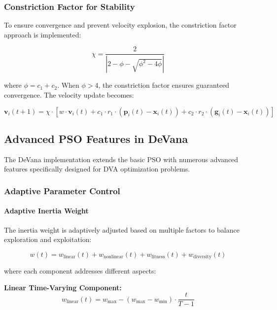 \documentclass[12pt,a4paper]{article}
\begin{document}
\subsubsection{Constriction Factor for Stability}

To ensure convergence and prevent velocity explosion, the constriction factor approach is implemented:

\begin{equation}
\chi = \frac{2}{|2 - \phi - \sqrt{\phi^2 - 4\phi}|} \label{eq:constriction_factor}
\end{equation}

where $\phi = c_1 + c_2$. When $\phi > 4$, the constriction factor ensures guaranteed convergence. The velocity update becomes:

\begin{equation}
\mathbf{v}_i(t+1) = \chi \cdot [w \cdot \mathbf{v}_i(t) + c_1 \cdot r_1 \cdot (\mathbf{p}_i(t) - \mathbf{x}_i(t)) + c_2 \cdot r_2 \cdot (\mathbf{g}_i(t) - \mathbf{x}_i(t))] \label{eq:pso_constricted_velocity}
\end{equation}

\subsection{Advanced PSO Features in DeVana}

The DeVana implementation extends the basic PSO with numerous advanced features specifically designed for DVA optimization problems.

\subsubsection{Adaptive Parameter Control}

\paragraph{Adaptive Inertia Weight}
The inertia weight is adaptively adjusted based on multiple factors to balance exploration and exploitation:

\begin{equation}
w(t) = w_{\text{linear}}(t) + w_{\text{nonlinear}}(t) + w_{\text{fitness}}(t) + w_{\text{diversity}}(t) \label{eq:adaptive_inertia}
\end{equation}

where each component addresses different aspects:

\textbf{Linear Time-Varying Component:}
\begin{equation}
w_{\text{linear}}(t) = w_{\max} - (w_{\max} - w_{\min}) \cdot \frac{t}{T-1} \label{eq:linear_inertia}
\end{equation}
\end{document}

